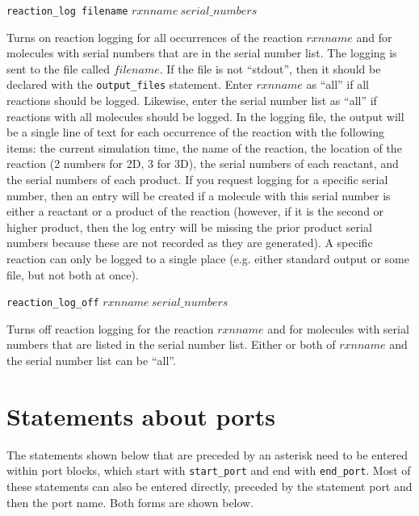 \documentclass {book}
\newcommand {\ttt} {\texttt}
\begin{document}
\begin{description}
\item{\ttt{reaction\_log filename} $rxnname\ serial\_numbers$}

Turns on reaction logging for all occurrences of the reaction $rxnname$ and for molecules with serial numbers that are in the serial number list. The logging is sent to the file called $filename$. If the file is not ``stdout'', then it should be declared with the \ttt{output\_files} statement. Enter $rxnname$ as ``all'' if all reactions should be logged. Likewise, enter the serial number list as ``all'' if reactions with all molecules should be logged. In the logging file, the output will be a single line of text for each occurrence of the reaction with the following items: the current simulation time, the name of the reaction, the location of the reaction (2 numbers for 2D, 3 for 3D), the serial numbers of each reactant, and the serial numbers of each product. If you request logging for a specific serial number, then an entry will be created if a molecule with this serial number is either a reactant or a product of the reaction (however, if it is the second or higher product, then the log entry will be missing the prior product serial numbers because these are not recorded as they are generated). A specific reaction can only be logged to a single place (e.g. either standard output or some file, but not both at once).

\item{\ttt{reaction\_log\_off} $rxnname\ serial\_numbers$}

Turns off reaction logging for the reaction $rxnname$ and for molecules with serial numbers that are listed in the serial number list. Either or both of $rxnname$ and the serial number list can be ``all''.

\end{description}

\section{Statements about ports}

The statements shown below that are preceded by an asterisk need to be entered within port blocks, which start with \ttt{start\_port} and end with \ttt{end\_port}. Most of these statements can also be entered directly, preceded by the statement port and then the port name. Both forms are shown below.
\end{document}
